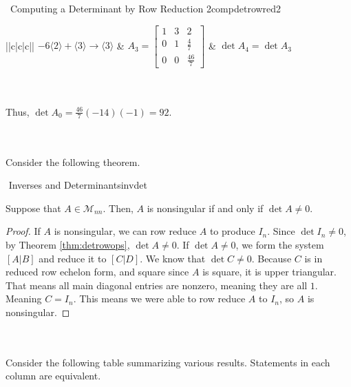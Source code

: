 \begin{example}{\Difficulty\,\Difficulty\,\,Computing a Determinant by Row Reduction 2}{compdetrowred2}
\begin{center}
\begin{tabular}{||c|c|c||}
                    \hline
                    \(-6\langle2\rangle+\langle3\rangle\to\langle3\rangle\) & \(A_3=\begin{bmatrix} 1 & 3 & 2 \\ 0 & 1 & \frac{4}{7} \\ 0 & 0 & \frac{46}{7} \end{bmatrix}\) & \(\det A_4=\det A_3\) \\
                    \hline
                \end{tabular}
            \end{center}
            \vphantom
            \\
            \\
            Thus, \(\det A_0=\frac{46}{7}(-14)(-1)=92\).

        \end{example}
        \vphantom
        \\
        \\
        Consider the following theorem.
        \begin{theorem}{\Stop\,\,Inverses and Determinants}{invdet}
            
            Suppose that \(A\in\mathcal{M}_{nn}\). Then, \(A\) is nonsingular if and only if \(\det A \neq 0\).
            \begin{proof}
                If \(A\) is nonsingular, we can row reduce \(A\) to produce \(I_n\). Since \(\det I_n\neq 0\), by Theorem \ref{thm:detrowops}, \(\det A\neq 0\). If \(\det A\neq 0\), we form the system \([A|B]\) and reduce it to \([C|D]\). We know that \(\det C\neq 0\). Because \(C\) is in reduced row echelon form, and square since \(A\) is square, it is upper triangular. That means all main diagonal entries are nonzero, meaning they are all \(1\). Meaning \(C=I_n\). This means we were able to row reduce \(A\) to \(I_n\), so \(A\) is nonsingular.
            \end{proof}
            
        \end{theorem}
        \vphantom
        \\
        \\
        Consider the following table summarizing various results. Statements in each column are equivalent.
